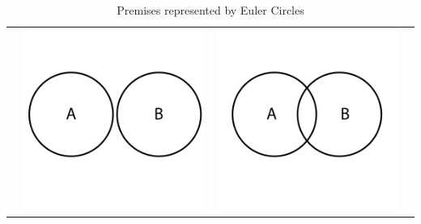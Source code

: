 \documentclass[12pt,a4paper]{report}
\begin{document}
\begin{table}[h!]
\begin{tabular}{  c  c  c  c }
\begin{minipage}{.22\textwidth}
    \end{minipage}
    & 
    \begin{minipage}{.22\textwidth}
      \includegraphics[width=\linewidth]{EEuler}
    \end{minipage}
    &
    \begin{minipage}{.22\textwidth}
      \includegraphics[width=\textwidth]{OEuler}
    \end{minipage}
    \\
  \end{tabular}
  \caption{Premises represented by Euler Circles}\label{tbl:eulerPremises}
\end{table}
\end{document}

